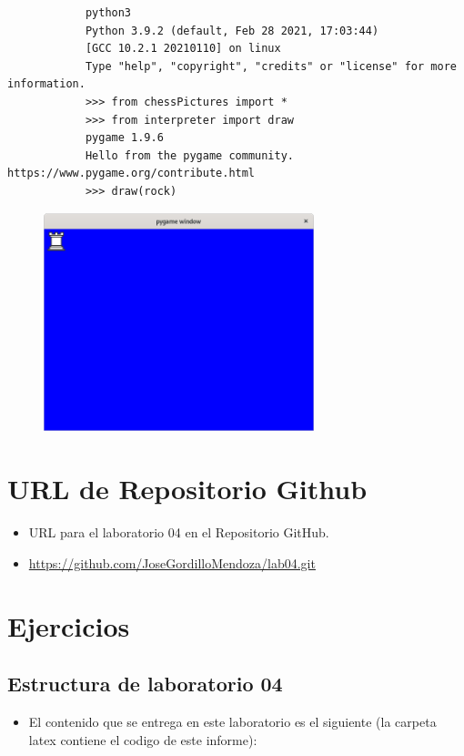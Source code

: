 \documentclass{article}
\begin{document}
        \begin{lstlisting}
            python3
            Python 3.9.2 (default, Feb 28 2021, 17:03:44) 
            [GCC 10.2.1 20210110] on linux
            Type "help", "copyright", "credits" or "license" for more information.
            >>> from chessPictures import *
            >>> from interpreter import draw
            pygame 1.9.6
            Hello from the pygame community. https://www.pygame.org/contribute.html
            >>> draw(rock)
        \end{lstlisting}

        \begin{figure}[H]
		\centering
		\includegraphics[width=0.7\textwidth,keepaspectratio]{img/pygame_rock.png}
	\end{figure}

	\section{URL de Repositorio Github}
	\begin{itemize}
		\item URL para el laboratorio 04 en el Repositorio GitHub.
		\item \url{https://github.com/JoseGordilloMendoza/lab04.git}
	\end{itemize}
	
	\section{Ejercicios}
 
        \subsection{Estructura de laboratorio 04}
	\begin{itemize}	
		\item El contenido que se entrega en este laboratorio es el siguiente (la carpeta latex contiene el codigo de este informe):
	\end{itemize}
	
\end{document}
